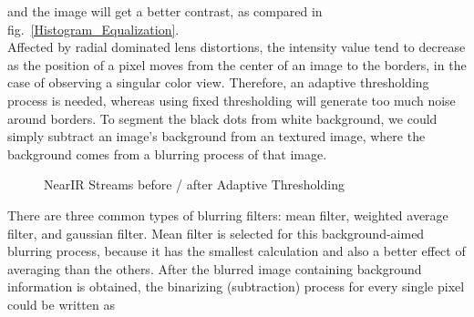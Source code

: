 %
\noindent
and the image will get a better contrast, as compared in fig.~\ref{Histogram_Equalization}.%
\\\indent%
Affected by radial dominated lens distortions, the intensity value tend to decrease as the position of a pixel moves from the center of an image to the borders, in the case of observing a singular color view. Therefore, an adaptive thresholding process is needed, whereas using fixed thresholding will generate too much noise around borders. To segment the black dots from white background, we could simply subtract an image's background from an textured image, where the background comes from a blurring process of that image.%
%
 \begin{figure}[t]
\hspace*{-0.5cm}
\centering
{}
\caption{NearIR Streams before / after Adaptive Thresholding}
\label{Adaptive_Thresholding}
\end{figure}%
%
There are three common types of blurring filters: mean filter, weighted average filter, and gaussian filter. Mean filter is selected for this background-aimed blurring process, because it has the smallest calculation and also a better effect of averaging than the others. After the blurred image containing background information is obtained, the binarizing (subtraction) process for every single pixel could be written as

